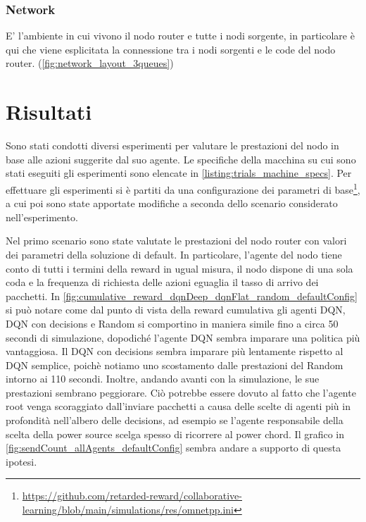 \documentclass[conference]{IEEEtran}
\begin{document}
\subsubsection{Network}
E' l'ambiente in cui vivono il nodo router e tutte i nodi sorgente, in particolare è qui che viene esplicitata la connessione tra i nodi sorgenti e le code del nodo router. (\autoref{fig:network_layout_3queues}) 

\section{Risultati}
Sono stati condotti diversi esperimenti per valutare le prestazioni del nodo in base 
alle azioni suggerite dal suo agente. Le specifiche della macchina su cui sono stati
eseguiti gli esperimenti sono elencate in \autoref{listing:trials_machine_specs}.
Per effettuare gli esperimenti si è partiti da una configurazione dei parametri di 
base\footnote{\href{https://github.com/retarded-reward/collaborative-learning/blob/main/simulations/res/omnetpp.ini}{https://github.com/retarded-reward/collaborative-learning/blob/main/simulations/res/omnetpp.ini}}, a cui poi sono state apportate modifiche a seconda dello scenario considerato
nell'esperimento.

Nel primo scenario sono state valutate le prestazioni del nodo router con valori dei
parametri della soluzione di default. In particolare, l'agente del nodo tiene conto
di tutti i termini della reward in ugual misura, il nodo dispone di una sola coda
e la frequenza di richiesta delle azioni eguaglia il tasso di arrivo dei pacchetti. 
In \autoref{fig:cumulative_reward_dqnDeep_dqnFlat_random_defaultConfig} si può notare
come dal punto di vista della reward cumulativa gli agenti DQN, DQN con decisions e
Random si comportino in maniera simile fino a circa 50 secondi di simulazione, dopodiché
l'agente DQN sembra imparare una politica più vantaggiosa. Il DQN con decisions sembra
imparare più lentamente rispetto al DQN semplice, poichè notiamo uno scostamento dalle
prestazioni del Random intorno ai 110 secondi. Inoltre, andando avanti con la simulazione,
le sue prestazioni sembrano peggiorare. Ciò potrebbe essere dovuto al fatto che 
l'agente root venga scoraggiato dall'inviare pacchetti a causa delle scelte di agenti
più in profondità nell'albero delle decisions, ad esempio se l'agente responsabile della
scelta della power source scelga spesso di ricorrere al power chord. Il grafico in 
\autoref{fig:sendCount_allAgents_defaultConfig} sembra andare a supporto di questa
ipotesi.
\end{document}
